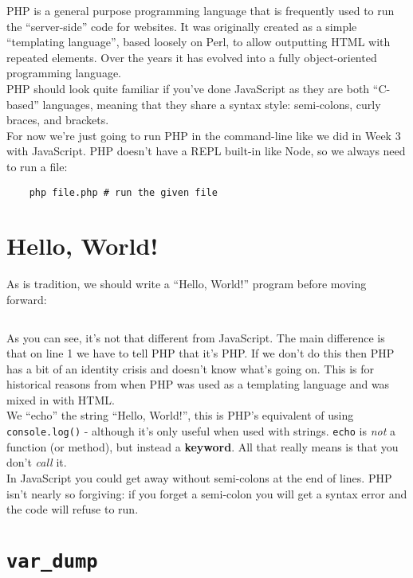 PHP is a general purpose programming language that is frequently used to run the ``server-side'' code for websites. It was originally created as a simple ``templating language'', based loosely on Perl, to allow outputting HTML with repeated elements. Over the years it has evolved into a fully object-oriented programming language.
\\

PHP should look quite familiar if you've done JavaScript as they are both ``C-based'' languages, meaning that they share a syntax style: semi-colons, curly braces, and brackets.
\\

For now we're just going to run PHP in the command-line like we did in Week 3 with JavaScript. PHP doesn't have a REPL built-in like Node, so we always need to run a file:

\begin{verbatim}
    php file.php # run the given file
\end{verbatim}


\section{Hello, World!}

As is tradition, we should write a ``Hello, World!'' program before moving forward:

\inputminted{php}{01/figures/01/01-hello.php}

As you can see, it's not that different from JavaScript. The main difference is that on line 1 we have to tell PHP that it's PHP. If we don't do this then PHP has a bit of an identity crisis and doesn't know what's going on. This is for historical reasons from when PHP was used as a templating language and was mixed in with HTML.
\\

We ``echo'' the string ``Hello, World!'', this is PHP's equivalent of using \texttt{console.log()} - although it's only useful when used with strings. \texttt{echo} is \textit{not} a function (or method), but instead a \textbf{keyword}. All that really means is that you don't \textit{call} it.
\\

In JavaScript you could get away without semi-colons at the end of lines. PHP isn't nearly so forgiving: if you forget a semi-colon you will get a syntax error and the code will refuse to run.


\section{\texttt{var\_dump}}

